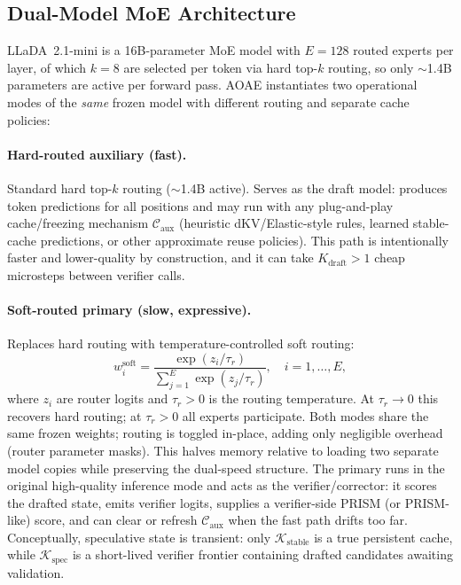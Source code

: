 \documentclass[11pt]{article}
\newcommand{\cK}{\mathcal{K}}
\newcommand{\cC}{\mathcal{C}}
\begin{document}
\subsection{Dual-Model MoE Architecture}
\label{sec:soft_moe}

LLaDA~2.1-mini is a 16B-parameter MoE model with $E{=}128$ routed experts per layer, of which $k{=}8$ are selected per token via hard top-$k$ routing, so only ${\sim}$1.4B parameters are active per forward pass.
AOAE instantiates two operational modes of the \emph{same} frozen model with different routing and separate cache policies:

\paragraph{Hard-routed auxiliary (fast).}
Standard hard top-$k$ routing (${\sim}$1.4B active).
Serves as the draft model: produces token predictions for all positions and may run with any plug-and-play cache/freezing mechanism $\cC_{\text{aux}}$ (heuristic dKV/Elastic-style rules, learned stable-cache predictions, or other approximate reuse policies).
This path is intentionally faster and lower-quality by construction, and it can take $K_{\text{draft}} > 1$ cheap microsteps between verifier calls.

\paragraph{Soft-routed primary (slow, expressive).}
Replaces hard routing with temperature-controlled soft routing:
\begin{equation}
    w_i^{\text{soft}} = \frac{\exp(z_i / \tau_r)}{\sum_{j=1}^E \exp(z_j / \tau_r)}, \quad i = 1, \dots, E,
    \label{eq:soft_route}
\end{equation}
where $z_i$ are router logits and $\tau_r > 0$ is the routing temperature.
At $\tau_r \to 0$ this recovers hard routing; at $\tau_r > 0$ all experts participate.
Both modes share the same frozen weights; routing is toggled in-place, adding only negligible overhead (router parameter masks).
This halves memory relative to loading two separate model copies while preserving the dual-speed structure. The primary runs in the original high-quality inference mode and acts as the verifier/corrector: it scores the drafted state, emits verifier logits, supplies a verifier-side PRISM (or PRISM-like) score, and can clear or refresh $\cC_{\text{aux}}$ when the fast path drifts too far. Conceptually, speculative state is transient: only $\cK_{\text{stable}}$ is a true persistent cache, while $\cK_{\text{spec}}$ is a short-lived verifier frontier containing drafted candidates awaiting validation.
\end{document}
